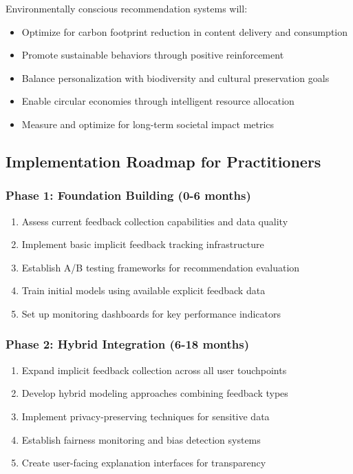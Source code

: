 \documentclass[acmsmall,review,anonymous]{acmart}
\begin{document}
Environmentally conscious recommendation systems will:
\begin{itemize}
    \item Optimize for carbon footprint reduction in content delivery and consumption
    \item Promote sustainable behaviors through positive reinforcement
    \item Balance personalization with biodiversity and cultural preservation goals
    \item Enable circular economies through intelligent resource allocation
    \item Measure and optimize for long-term societal impact metrics
\end{itemize}

\subsection{Implementation Roadmap for Practitioners}

\subsubsection{Phase 1: Foundation Building (0-6 months)}

\begin{enumerate}
    \item Assess current feedback collection capabilities and data quality
    \item Implement basic implicit feedback tracking infrastructure
    \item Establish A/B testing frameworks for recommendation evaluation
    \item Train initial models using available explicit feedback data
    \item Set up monitoring dashboards for key performance indicators
\end{enumerate}

\subsubsection{Phase 2: Hybrid Integration (6-18 months)}

\begin{enumerate}
    \item Expand implicit feedback collection across all user touchpoints
    \item Develop hybrid modeling approaches combining feedback types
    \item Implement privacy-preserving techniques for sensitive data
    \item Establish fairness monitoring and bias detection systems
    \item Create user-facing explanation interfaces for transparency
\end{enumerate}
\end{document}
